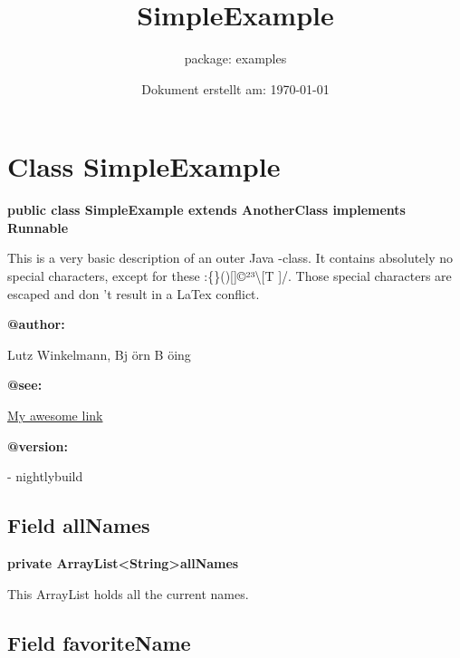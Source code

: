 \documentclass[12pt]{scrreprt}
\title{SimpleExample}
\subtitle{package: examples}
\date{Dokument erstellt am: \today}
\begin{document}

\maketitle
\newpage


\tableofcontents
\newpage

\setcounter{page}{0}


\chapter{Class SimpleExample}
\label{examples.SimpleExample}




\textbf{public class SimpleExample extends AnotherClass implements Runnable}


This is a very basic description of an outer Java -class. It contains absolutely no special characters, except for these :\{\}()[]©²³\textbackslash[T ]/. Those special characters are escaped and don 't result in a LaTex conflict.


\textbf{@author:}

\quad\quad Lutz Winkelmann, Bj örn B öing

\textbf{@see:}

\quad\quad \hyperref[examples.SimpleExample.My22Class:getx]{\color{tagLink}My awesome link}

\textbf{@version:}

\quad{}- nightlybuild


\section{Field allNames}
\label{examples.SimpleExample:allNames}




\textbf{private ArrayList\textless String\textgreater  allNames}


This ArrayList holds all the current names.



\section{Field favoriteName}
\label{examples.SimpleExample:favoriteName}
\end{document}
